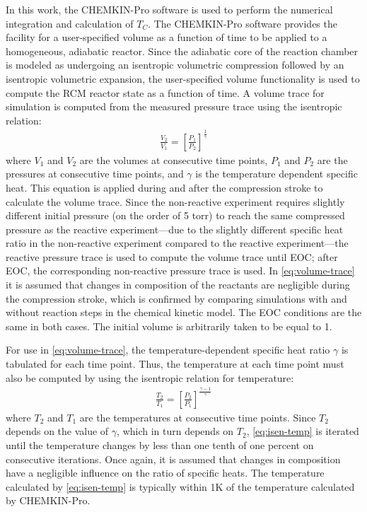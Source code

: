 \documentclass[../main.tex]{subfiles}
\begin{document}
In this work, the CHEMKIN-Pro \cite{Chemkin2012} software is used to
perform the numerical integration and calculation of $T_C$. The
CHEMKIN-Pro software provides the facility for a user-specified
volume as a function of time to be applied to a homogeneous,
adiabatic reactor. Since the adiabatic core of the reaction chamber
is modeled as undergoing an isentropic volumetric compression followed
by an isentropic volumetric expansion, the user-specified volume
functionality is used to compute the RCM reactor state as a function
of time. A volume trace for simulation is computed from the measured
pressure trace using the isentropic relation:
%
\begin{align}
\frac{V_2}{V_1} = \left[\frac{P_1}{P_2}\right]^{\frac{1}{\gamma}}
\label{eq:volume-trace}
\end{align}
%
where $V_1$ and $V_2$ are the volumes at consecutive time points,
$P_1$ and $P_2$ are the pressures at consecutive time points, and
$\gamma$ is the temperature dependent specific heat. This equation
is applied during and after the compression stroke to calculate
the volume trace. Since the non-reactive experiment requires slightly
different initial pressure (on the order of 5 torr) to reach the same
compressed pressure as the reactive experiment---due to the slightly
different specific heat ratio in the non-reactive experiment compared
to the reactive experiment---the reactive pressure trace is used to
compute the volume trace until EOC; after EOC, the corresponding
non-reactive pressure trace is used. In \cref{eq:volume-trace} it is assumed that
changes in composition of the reactants are negligible during the
compression stroke, which is confirmed by comparing simulations with and
without reaction steps in the chemical kinetic model. The EOC conditions
are the same in both cases. The initial volume is arbitrarily taken
to be equal to 1.

For use in \cref{eq:volume-trace}, the temperature-dependent specific
heat ratio $\gamma$ is tabulated for each time point. Thus, the
temperature at each time point must also be computed by using the
isentropic relation for temperature:
%
\begin{align}
\frac{T_2}{T_1} = \left[\frac{P_2}{P_1}\right]^{\frac{\gamma-1}{\gamma}}
\label{eq:isen-temp}
\end{align}
%
where $T_2$ and $T_1$ are the temperatures at consecutive time points.
Since $T_2$ depends on the value of $\gamma$, which in turn depends
on $T_2$, \cref{eq:isen-temp} is iterated until the temperature
changes by less than one tenth of one percent on consecutive iterations.
Once again, it is assumed that changes in composition have a negligible
influence on the ratio of specific heats.
The temperature calculated by \cref{eq:isen-temp} is typically within
1K of the temperature calculated by CHEMKIN-Pro.
\end{document}
